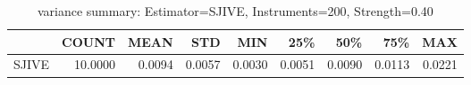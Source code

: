 \begin{table}[ht]
\centering
\caption{variance summary: Estimator=SJIVE, Instruments=200, Strength=0.40}
\begin{tabular}{lrrrrrrrr}
\toprule
 & COUNT & MEAN & STD & MIN & 25\% & 50\% & 75\% & MAX \\
\midrule
SJIVE & 10.0000 & 0.0094 & 0.0057 & 0.0030 & 0.0051 & 0.0090 & 0.0113 & 0.0221 \\
\bottomrule
\end{tabular}
\end{table}
